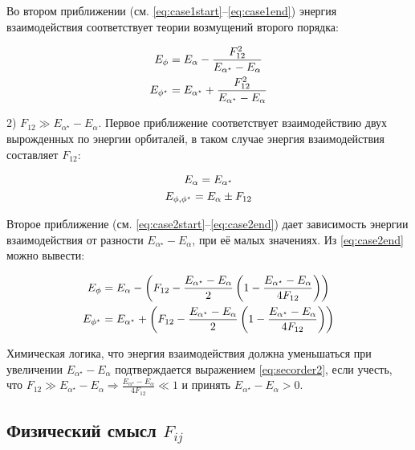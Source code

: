 \documentclass{article}
\begin{document}
Во втором приближении (см. \eqref{eq:case1start}--\eqref{eq:case1end}) энергия взаимодействия соответствует теории возмущений второго порядка:

\begin{gather} 
    E_{\phi} = E_{\alpha} - \frac{F_{12}^2}{E_{\alpha^{\star}}-E_{\alpha}}\notag\\
    E_{\phi^{\star}} = E_{\alpha^{\star}} + \frac{F_{12}^2}{E_{\alpha^{\star}}-E_{\alpha}}
\end{gather}

2) $F_{12} \gg E_{\alpha^{\star}} - E_{\alpha}$. Первое приближение соответствует взаимодействию двух вырожденных по энергии орбиталей, в таком случае энергия взаимодействия составляет $F_{12}$:

\begin{gather} 
    E_{\alpha} = E_{\alpha^{\star}} \notag\\
    E_{\phi,\phi^{\star}} = E_{\alpha} \pm F_{12}
\end{gather}

Второе приближение (см. \eqref{eq:case2start}--\eqref{eq:case2end}) дает зависимость энергии взаимодействия от разности $E_{\alpha^{\star}} - E_{\alpha}$, при её малых значениях. Из \eqref{eq:case2end} можно вывести:

\begin{gather} 
    E_{\phi} = E_{\alpha} - \left( F_{12} - \frac{E_{\alpha^{\star}} - E_{\alpha}}{2} \left( 1 - \frac{E_{\alpha^{\star}} - E_{\alpha}}{4 F_{12}} \right) \right) \notag\\
    E_{\phi^{\star}} = E_{\alpha^{\star}} + \left( F_{12} - \frac{E_{\alpha^{\star}} - E_{\alpha}}{2} \left( 1 - \frac{E_{\alpha^{\star}} - E_{\alpha}}{4 F_{12}} \right) \right)
    \label{eq:secorder2}
\end{gather}

Химическая логика, что энергия взаимодействия должна уменьшаться при увеличении $E_{\alpha^{\star}} - E_{\alpha}$ подтверждается выражением \eqref{eq:secorder2}, если учесть, что $F_{12} \gg E_{\alpha^{\star}} - E_{\alpha} \Rightarrow \frac{E_{\alpha^{\star}} - E_{\alpha}}{4 F_{12}} \ll 1$ и принять $E_{\alpha^{\star}} - E_{\alpha} > 0$. 

\subsection{Физический смысл $F_{ij}$}
\end{document}
